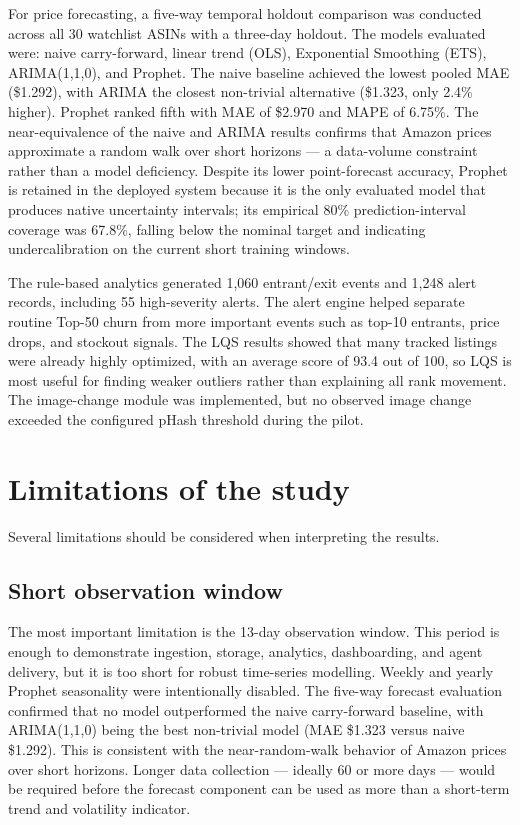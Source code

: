 For price forecasting, a five-way temporal holdout comparison was conducted across all 30 watchlist ASINs with a three-day holdout. The models evaluated were: naive carry-forward, linear trend (OLS), Exponential Smoothing (ETS), ARIMA(1,1,0), and Prophet. The naive baseline achieved the lowest pooled MAE (\$1.292), with ARIMA the closest non-trivial alternative (\$1.323, only 2.4\% higher). Prophet ranked fifth with MAE of \$2.970 and MAPE of 6.75\%. The near-equivalence of the naive and ARIMA results confirms that Amazon prices approximate a random walk over short horizons — a data-volume constraint rather than a model deficiency. Despite its lower point-forecast accuracy, Prophet is retained in the deployed system because it is the only evaluated model that produces native uncertainty intervals; its empirical 80\% prediction-interval coverage was 67.8\%, falling below the nominal target and indicating undercalibration on the current short training windows.

The rule-based analytics generated 1,060 entrant/exit events and 1,248 alert records, including 55 high-severity alerts. The alert engine helped separate routine Top-50 churn from more important events such as top-10 entrants, price drops, and stockout signals. The LQS results showed that many tracked listings were already highly optimized, with an average score of 93.4 out of 100, so LQS is most useful for finding weaker outliers rather than explaining all rank movement. The image-change module was implemented, but no observed image change exceeded the configured pHash threshold during the pilot.

\section{Limitations of the study}

Several limitations should be considered when interpreting the results.

\subsection{Short observation window}

The most important limitation is the 13-day observation window. This period is enough to demonstrate ingestion, storage, analytics, dashboarding, and agent delivery, but it is too short for robust time-series modelling. Weekly and yearly Prophet seasonality were intentionally disabled. The five-way forecast evaluation confirmed that no model outperformed the naive carry-forward baseline, with ARIMA(1,1,0) being the best non-trivial model (MAE \$1.323 versus naive \$1.292). This is consistent with the near-random-walk behavior of Amazon prices over short horizons. Longer data collection — ideally 60 or more days — would be required before the forecast component can be used as more than a short-term trend and volatility indicator.

